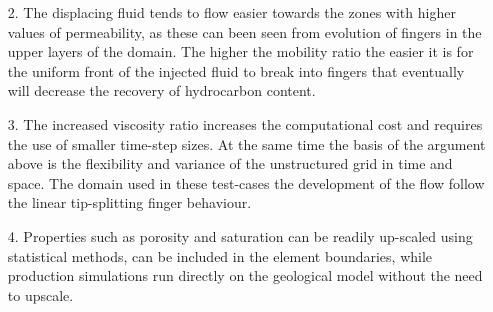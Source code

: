 \documentclass[preprint,authoryear,12pt]{elsarticle}
\begin{document}
{\begin{enumerate}
\item[2.] The displacing fluid tends to flow easier towards the zones with higher values of permeability, as these can been seen from evolution of fingers in the upper layers of the domain. The higher the mobility ratio the easier it is for the uniform front of the injected fluid to break into fingers that eventually will decrease the recovery of hydrocarbon content.
\item[3.] The increased viscosity ratio increases the computational cost and requires the use of smaller time-step sizes. At the same time the basis of the argument above is the flexibility and variance of the unstructured grid in time and space. The domain used in these test-cases the development of the flow follow the linear tip-splitting finger behaviour.
\item[4.] Properties such as porosity and saturation can be readily up-scaled using statistical methods, can be included in the element boundaries,  while production simulations run directly on the geological model without the need to upscale.
\end{enumerate}


}
\end{document}
